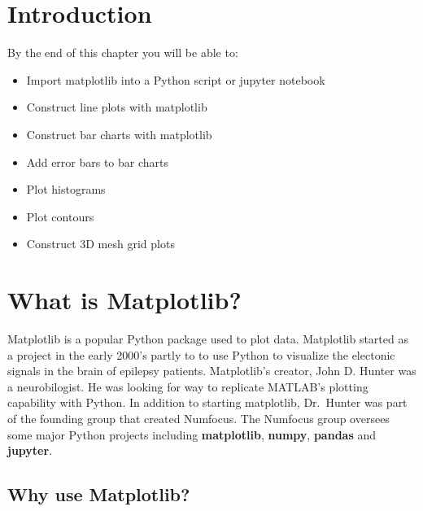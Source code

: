 \documentclass{book}
\begin{document}
    
        \section{Introduction}\label{introduction}
    




    
        By the end of this chapter you will be able to:

\begin{itemize}
\item
  Import matplotlib into a Python script or jupyter notebook
\item
  Construct line plots with matplotlib
\item
  Construct bar charts with matplotlib
\item
  Add error bars to bar charts
\item
  Plot histograms
\item
  Plot contours
\item
  Construct 3D mesh grid plots
\end{itemize}
    




    
        \section{What is Matplotlib?}\label{what-is-matplotlib}
    




    
        Matplotlib is a popular Python package used to plot data. Matplotlib
started as a project in the early 2000's partly to to use Python to
visualize the electonic signals in the brain of epilepsy patients.
Matplotlib's creator, John D. Hunter was a neurobilogist. He was looking
for way to replicate MATLAB's plotting capability with Python. In
addition to starting matplotlib, Dr.~Hunter was part of the founding
group that created Numfocus. The Numfocus group oversees some major
Python projects including \textbf{matplotlib}, \textbf{numpy},
\textbf{pandas} and \textbf{jupyter}.
    




    
        \subsection{Why use Matplotlib?}\label{why-use-matplotlib}
    
\end{document}
